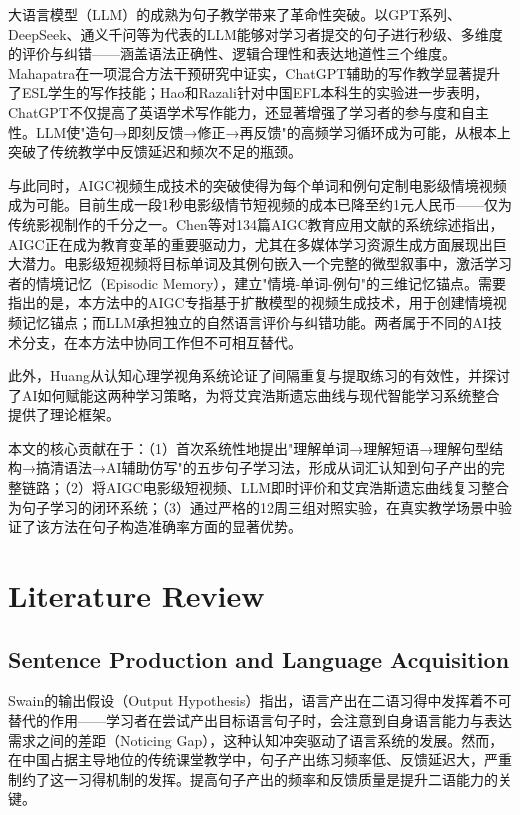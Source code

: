 \documentclass[12pt,a4paper]{ctexart}
\begin{document}
大语言模型（LLM）的成熟为句子教学带来了革命性突破。以GPT系列、DeepSeek、通义千问等为代表的LLM能够对学习者提交的句子进行秒级、多维度的评价与纠错——涵盖语法正确性、逻辑合理性和表达地道性三个维度。Mahapatra\cite{mahapatra2024impact}在一项混合方法干预研究中证实，ChatGPT辅助的写作教学显著提升了ESL学生的写作技能；Hao和Razali\cite{hongxia2025impact}针对中国EFL本科生的实验进一步表明，ChatGPT不仅提高了英语学术写作能力，还显著增强了学习者的参与度和自主性。LLM使"造句→即刻反馈→修正→再反馈"的高频学习循环成为可能，从根本上突破了传统教学中反馈延迟和频次不足的瓶颈。

与此同时，AIGC视频生成技术的突破使得为每个单词和例句定制电影级情境视频成为可能。目前生成一段1秒电影级情节短视频的成本已降至约1元人民币——仅为传统影视制作的千分之一。Chen等\cite{chen2024empowering}对134篇AIGC教育应用文献的系统综述指出，AIGC正在成为教育变革的重要驱动力，尤其在多媒体学习资源生成方面展现出巨大潜力。电影级短视频将目标单词及其例句嵌入一个完整的微型叙事中，激活学习者的情境记忆（Episodic Memory），建立"情境-单词-例句"的三维记忆锚点。需要指出的是，本方法中的AIGC专指基于扩散模型的视频生成技术，用于创建情境视频记忆锚点；而LLM承担独立的自然语言评价与纠错功能。两者属于不同的AI技术分支，在本方法中协同工作但不可相互替代。

此外，Huang\cite{huang2025spaced}从认知心理学视角系统论证了间隔重复与提取练习的有效性，并探讨了AI如何赋能这两种学习策略，为将艾宾浩斯遗忘曲线与现代智能学习系统整合提供了理论框架。

本文的核心贡献在于：（1）首次系统性地提出"理解单词→理解短语→理解句型结构→搞清语法→AI辅助仿写"的五步句子学习法，形成从词汇认知到句子产出的完整链路；（2）将AIGC电影级短视频、LLM即时评价和艾宾浩斯遗忘曲线复习整合为句子学习的闭环系统；（3）通过严格的12周三组对照实验，在真实教学场景中验证了该方法在句子构造准确率方面的显著优势。


\section{Literature Review}  %

\subsection{Sentence Production and Language Acquisition}

Swain的输出假设（Output Hypothesis）指出，语言产出在二语习得中发挥着不可替代的作用——学习者在尝试产出目标语言句子时，会注意到自身语言能力与表达需求之间的差距（Noticing Gap），这种认知冲突驱动了语言系统的发展\cite{swain1995three}。然而，在中国占据主导地位的传统课堂教学中，句子产出练习频率低、反馈延迟大，严重制约了这一习得机制的发挥。提高句子产出的频率和反馈质量是提升二语能力的关键。
\end{document}
